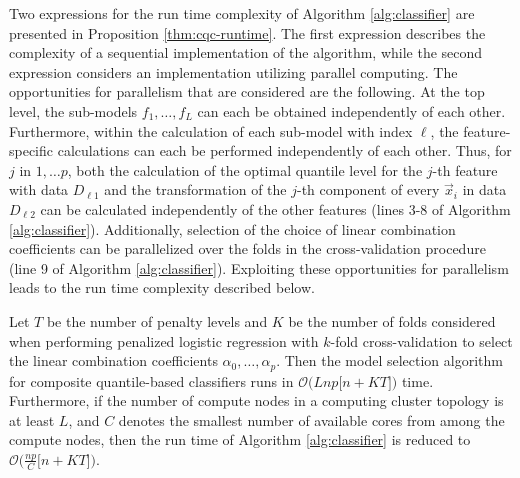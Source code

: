 Two expressions for the run time complexity of Algorithm \ref{alg:classifier}
are presented in Proposition \ref{thm:cqc-runtime}.  The first expression
describes the complexity of a sequential implementation of the algorithm, while
the second expression considers an implementation utilizing parallel computing.
The opportunities for parallelism that are considered are the following.  At the
top level, the sub-models $f_1, \dots, f_L$ can each be obtained independently
of each other.  Furthermore, within the calculation of each sub-model with index
$\ell$, the feature-specific calculations can each be performed independently of
each other.  Thus, for $j$ in $1, \dots p$, both the calculation of the optimal
quantile level for the $j$-th feature with data $D_{\ell 1}$ and the
transformation of the $j$-th component of every $\vec{x}_i$ in data $D_{\ell 2}$
can be calculated independently of the other features (lines 3-8 of Algorithm
\ref{alg:classifier}).  Additionally, selection of the choice of linear
combination coefficients can be parallelized over the folds in the
cross-validation procedure (line 9 of Algorithm \ref{alg:classifier}).
Exploiting these opportunities for parallelism leads to the run time complexity
described below.

\begin{proposition}
  \label{thm:cqc-runtime}
  Let $T$ be the number of penalty levels and $K$ be the number of folds
  considered when performing penalized logistic regression with $k$-fold
  cross-validation to select the linear combination coefficients
  $\alpha_0, \dots, \alpha_p$.  Then the model selection algorithm for composite
  quantile-based classifiers runs in
  $\mathcal{O}\Big( Lnp \big[ n + KT \big]\Big)$ time.  Furthermore, if the
  number of compute nodes in a computing cluster topology is at least $L$, and
  $C$ denotes the smallest number of available cores from among the compute
  nodes, then the run time of Algorithm \ref{alg:classifier} is reduced to
  $\mathcal{O}\Big( \frac{np}{C} \big[ n + KT \big] \Big)$.
\end{proposition}


